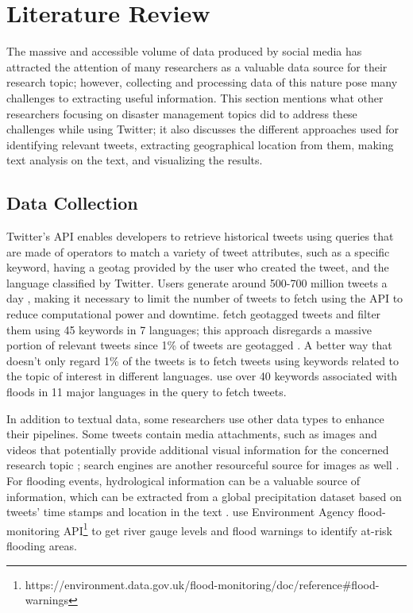 \chapter{Literature Review}

The massive and accessible volume of data produced by social media has attracted the attention of
many researchers as a valuable data source for their research topic; however, collecting and
processing data of this nature pose many challenges to extracting useful information. This section
mentions what other researchers focusing on disaster management topics did to address these
challenges while using Twitter; it also discusses the different approaches used for identifying
relevant tweets, extracting geographical location from them, making text analysis on the text, and visualizing the results.

\section{Data Collection} 

Twitter's \ac{API} enables developers to retrieve historical tweets using queries that are made of
operators to match a variety of tweet attributes, such as a specific keyword, having a geotag
provided by the user who created the tweet, and the language classified by Twitter. Users generate
around 500-700 million tweets a day \cite{inproceedings}, making it necessary to limit the number of
tweets to fetch using the \ac{API} to reduce computational power and downtime.
 fetch geotagged tweets and filter them using 45 keywords
in 7 languages; this approach disregards a massive portion of relevant tweets since 1\% of tweets
are geotagged \cite{middletonRealTimeCrisisMapping2014}. A better way that doesn't only regard 1\%
of the tweets is to fetch tweets using keywords related to the topic of interest in different
languages.  use over 40 keywords associated with
floods in 11 major languages in the query to fetch tweets.

In addition to textual data, some researchers use other data types to enhance their pipelines. Some
tweets contain media attachments, such as images and videos that potentially provide additional
visual information for the concerned research topic
\cite{alamFloodDetectionTwitter2020}\cite{ningPrototypingSocialMedia2020}\cite{saidFloodsDetectionTwitter2020};
search engines are another resourceful source for images as well
\cite{fengExtractionPluvialFlood2018}. For flooding events, hydrological information can be a
valuable source of information, which can be extracted from a global precipitation dataset based on
tweets' time stamps and location in the text \cite{debruijnImprovingClassificationFlood2020}.
 use Environment Agency flood-monitoring
\ac{API}\footnote{https://environment.data.gov.uk/flood-monitoring/doc/reference\#flood-warnings} to
get river gauge levels and flood warnings to identify at-risk flooding areas.

